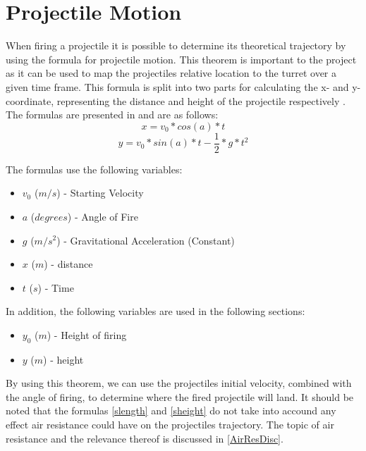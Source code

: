 \section{Projectile Motion}\label{ProjMotion}
When firing a projectile it is possible to determine its theoretical trajectory
by using the formula for projectile motion. This theorem is important to the
project as it can be used to map the projectiles relative location to the turret
over a given time frame. This formula is split into two parts for calculating
the x- and y-coordinate, representing the distance and height of the projectile respectively . The formulas are presented in
\citep[Ch. 6.2]{OrbitBA} and are as follows:
\begin{equation}\label{slength}
x=v_0*cos(a)*t
\end{equation}
\begin{equation}\label{sheight}
y=v_0*sin(a)*t-\frac{1}{2}*g*t^2
\end{equation}

The formulas use the following variables:
\begin{itemize}
  \item $v_0$ ($m/s$) - Starting Velocity
  \item $a$ ($degrees$) - Angle of Fire
  \item $g$ ($m/s^2$) - Gravitational Acceleration (Constant)
  \item $x$ ($m$) - distance
  \item $t$ ($s$) - Time
\end{itemize}
In addition, the following variables are used in the following sections:
\begin{itemize}
  \item $y_0$ ($m$) - Height of firing
  \item $y$ ($m$) - height
\end{itemize}

By using this theorem, we can use the projectiles initial velocity, combined
with the angle of firing, to determine where the fired projectile will
land.\nl
It should be noted that the formulas \autoref{slength} and \autoref{sheight} do
not take into accound any effect air resistance could have on the projectiles
trajectory. The topic of air resistance and the relevance thereof is discussed
in \autoref{AirResDisc}.

